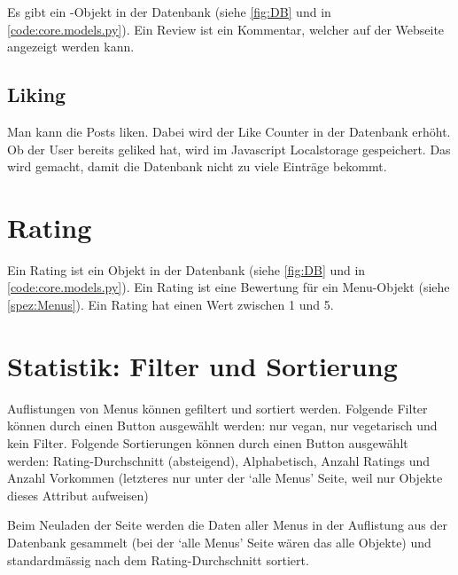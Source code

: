 Es gibt ein -Objekt in der Datenbank (siehe \ref{fig:DB} und in
\ref{code:core.models.py}). Ein Review ist ein Kommentar, welcher auf der
Webseite angezeigt werden kann.

\subsection{Liking} \label{spez:Liking}

Man kann die Posts liken. Dabei wird der Like Counter in der Datenbank erhöht.
Ob der User bereits geliked hat, wird im Javascript Localstorage gespeichert.
Das wird gemacht, damit die Datenbank nicht zu viele Einträge bekommt.

\section{Rating} \label{spez:Rating}

Ein Rating ist ein Objekt in der Datenbank (siehe \ref{fig:DB} und in
\ref{code:core.models.py}). Ein Rating ist eine Bewertung für ein Menu-Objekt
(siehe \ref{spez:Menus}). Ein Rating hat einen Wert zwischen 1 und 5.

\section{Statistik: Filter und Sortierung} \label{spez:Statistik}

Auflistungen von Menus können gefiltert und sortiert werden. Folgende Filter
können durch einen Button ausgewählt werden: nur vegan, nur vegetarisch und kein
Filter. Folgende Sortierungen können durch einen Button ausgewählt werden:
Rating-Durchschnitt (absteigend), Alphabetisch, Anzahl Ratings und Anzahl
Vorkommen (letzteres nur unter der `alle Menus' Seite, weil nur 
Objekte dieses Attribut aufweisen) 

Beim Neuladen der Seite werden die Daten
aller Menus in der Auflistung aus der Datenbank gesammelt (bei der `alle Menus'
Seite wären das alle  Objekte) und standardmässig nach dem
Rating-Durchschnitt sortiert. 

